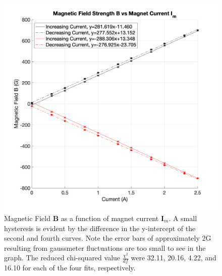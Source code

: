 \documentclass[%
 aip,
rsi,%
 amsmath,amssymb,
 reprint,%
author-numerical,%
]{revtex4-1}
\begin{document}
\begin{figure}[H]
\includegraphics[width=1\linewidth]{lateximages/MagneticField.png} 
\caption{\label{fig:MagneticField} Magnetic Field $\boldsymbol { B }$ as a function of magnet current $\boldsymbol { I}_{m}$. A small hysteresis is evident by the difference in the y-intercept of the second and fourth curves. Note the error bars of approximately 2G resulting from gaussmeter fluctuations are too small to see in the graph. The reduced chi-squared value $\frac{\chi^{2}}{df}$ were 32.11, 20.16, 4.22, and 16.10 for each of the four fits, respectively.}
\end{figure}
\end{document}
